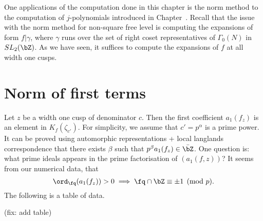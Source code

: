 \documentclass [11pt, proquest] {uwthesis}[2015/03/03]
\begin{document}
One applications of the computation done in this chapter is the norm method to the computation of $j$-polynomials 
introduced in Chapter~. Recall that the issue with the norm method for non-square free level is computing the 
expansions of form $f | \gamma$, where $\gamma$ runs over the set of right coset representatives of $\Gamma_0(N)$ 
in $SL_2(\bZ)$. As we have seen, it suffices to compute the expansions of 
$f$ at all width one cusps.
\iffalse
\begin{Lemma}
For any cusp $z$ of $X_0(N)$, there exists an Atkin-Lehner involution $w \in W(N)$ such that $z_1 = w(z)$ has 
width one.
\end{Lemma}

\begin{proof}
Let $z \neq [\infty]$ be a cusp. Recall that $z$ has width one if and only if its denominator $d(z)$ satisfies
$d(z)^2 \equiv 0 \pmod{N}$. Let $p$ be a prime divisor of $N$. Then it is easy to see that 
$v_p(d(w_p(z))) = v_p(N) -  v_p(d(z))$ and $v_l(d(w_p(z))) = v_l(d(z))$ for primes $l \neq p$. The lemma now follows by taking $w = \prod_{p \mid N: v_p(d(z)) \leq v_p(N)/2} w_p$. 
\end{proof}
\fi

\section{Norm of first terms}

Let $z$ be a width one cusp of denominator $c$. Then the first coefficient $a_1(f_z)$ is an element in $K_f(\zeta_{c'})$. For simplicity, we assume that $c' = p^{\alpha}$ is a prime power. It can be proved using automorphic representations + local langlands correspondence that there exists $\beta$ such that $p^\beta a_1(f_z) \in \bar{\bZ}$.  One question is: what prime ideals appears in the prime factorisation of $(a_1(f,z))$?  It seems from our numerical data, that
\[
	\ord_\fq(a_1(f_z)) > 0 \implies \fq \cap \bZ \equiv \pm 1 \pmod {p}.
\]
The following is a table of data. 

(fix: add table)

 

 

\nocite{*}


\end{document}
